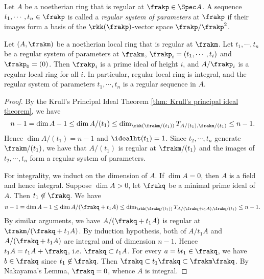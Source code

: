    \begin{definition}\label{def: regular system of parameters}
        Let \(A\) be a noetherian ring that is regular at \(\frakp \in \Spec A\).
        A sequence \(t_1,\cdots,t_n \in \frakp\) is called a \emph{regular system of parameters} at \(\frakp\) if their images form a basis of the \(\rkk(\frakp)\)-vector space \(\frakp/\frakp^2\).
    \end{definition}

    \begin{proposition}\label{prop: regular system of parameters is a regular sequence}
        Let \((A,\frakm)\) be a noetherian local ring that is regular at \(\frakm\).
        Let \(t_1,\cdots,t_n\) be a regular system of parameters at \(\frakm\), \(\frakp_i = (t_1,\cdots,t_i)\) and \(\frakp_0 = (0)\).
        Then \(\frakp_i\) is a prime ideal of height \(i\), and \(A/\frakp_i\) is a regular local ring for all \(i\).
        In particular, regular local ring is integral, and the regular system of parameters \(t_1,\cdots,t_n\) is a regular sequence in \(A\).
    \end{proposition}
    \begin{proof}
        By the Krull's Principal Ideal Theorem \ref{thm: Krull's principal ideal theorem}, we have 
        \[ n-1 = \dim A - 1 \leq \dim A/(t_1) \leq \dim_{\rkk(\frakm/(t_1))} T_{A/(t_1), \frakm/(t_1)} \leq n-1.  \]
        Hence \(\dim A/(t_1) = n-1\) and \(\idealht (t_1) = 1\).
        Since \(t_2,\cdots,t_n\) generate \(\frakm/(t_1)\), we have that \(A/(t_1)\) is regular at \(\frakm/(t_1)\) and the images of \(t_2,\cdots,t_n\) form a regular system of parameters.
    
        For integrality, we induct on the dimension of \(A\).
        If \(\dim A = 0\), then \(A\) is a field and hence integral.
        Suppose \(\dim A > 0\), let \(\frakq\) be a minimal prime ideal of \(A\).
        Then \(t_1 \not\in \frakq\).
        We have 
        \[ n - 1 = \dim A - 1 \leq \dim A/(\frakq + t_1A) \leq \dim_{\rkk(\frakq/(t_1))} T_{A/(\frakq + t_1A), \frakq/(t_1)} \leq n - 1. \]
        By similar arguments, we have \(A/(\frakq + t_1A)\) is regular at \(\frakm/(\frakq + t_1A)\).
        By induction hypothesis, both of \(A/t_1A\) and \(A/(\frakq + t_1A)\) are integral and of dimension \(n-1\).
        Hence \(t_1 A = t_1 A + \frakq\), i.e. \(\frakq \subset t_1 A\).
        For every \(a = bt_1 \in \frakq\), we have \(b \in \frakq\) since \(t_1 \not\in \frakq\).
        Then \(\frakq \subset t_1\frakq \subset \frakm \frakq\).
        By Nakayama's Lemma, \(\frakq = 0\), whence \(A\) is integral. 
    \end{proof}

